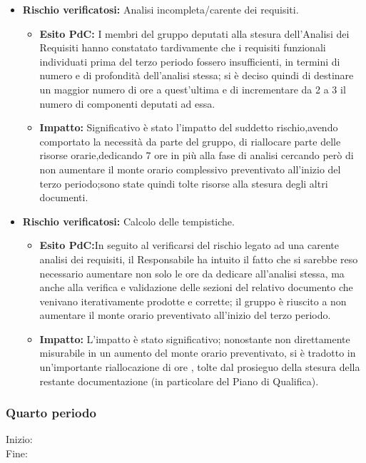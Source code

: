 \begin{itemize}
\item \textbf{Rischio verificatosi:} Analisi incompleta/carente dei requisiti.
\begin{itemize}
\item \textbf{Esito PdC:} I membri del gruppo deputati alla stesura dell'Analisi dei Requisiti hanno constatato tardivamente
che i requisiti funzionali individuati prima del terzo periodo fossero insufficienti, in termini di numero e di 
profondità dell'analisi stessa; si è deciso quindi di destinare un maggior numero di ore a quest'ultima e di incrementare da
 2 a 3 il numero di componenti deputati ad essa. \\
\item \textbf{Impatto:} Significativo è stato l'impatto del suddetto rischio,avendo comportato la necessità
da parte del gruppo, di riallocare parte delle risorse orarie,dedicando 7 ore in più alla fase di analisi
cercando però di non aumentare il monte orario complessivo preventivato all'inizio del terzo periodo;sono state
quindi tolte risorse alla stesura degli altri documenti.\\
\end{itemize}

\item \textbf{Rischio verificatosi:} Calcolo delle tempistiche.\\
\begin{itemize}
\item \textbf{Esito PdC:}In seguito al verificarsi del rischio legato ad una carente analisi dei requisiti, il Responsabile ha 
intuito il fatto che si sarebbe reso necessario aumentare non solo le ore da dedicare all'analisi stessa, ma anche alla verifica e 
validazione delle sezioni del relativo documento che venivano iterativamente prodotte e corrette; il gruppo è riuscito  a non aumentare
il monte orario preventivato all'inizio del terzo periodo.\\
\item \textbf{Impatto:} L'impatto è stato significativo; nonostante non direttamente misurabile in un aumento del monte orario preventivato,
si è tradotto in un'importante riallocazione di ore , tolte dal prosieguo della stesura della restante documentazione (in particolare del Piano
di Qualifica).
\end{itemize}
\end{itemize}

\subsubsection{Quarto periodo} 
Inizio: \\
Fine: 
